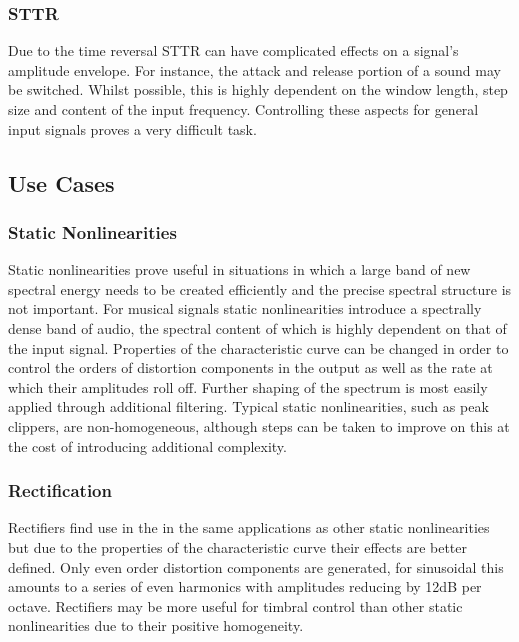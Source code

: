 		\subsubsection*{STTR}
			Due to the time reversal STTR can have complicated effects on a signal's amplitude envelope.  For
			instance, the attack and release portion of a sound may be switched. Whilst possible, this is
			highly dependent on the window length, step size and content of the input frequency. Controlling
			these aspects for general input signals proves a very difficult task.

	\subsection{Use Cases}
	\label{sec:ExcitationEvaluation-Comparison-UseCases}


		\subsubsection*{Static Nonlinearities}
			Static nonlinearities prove useful in situations in which a large band of new spectral energy needs
			to be created efficiently and the precise spectral structure is not important. For musical signals
			static nonlinearities introduce a spectrally dense band of audio, the spectral content of which is
			highly dependent on that of the input signal. Properties of the characteristic curve can be changed
			in order to control the orders of distortion components in the output as well as the rate at which
			their amplitudes roll off. Further shaping of the spectrum is most easily applied through
			additional filtering. Typical static nonlinearities, such as peak clippers, are non-homogeneous,
			although steps can be taken to improve on this at the cost of introducing additional complexity.
			
		\subsubsection*{Rectification}
			Rectifiers find use in the in the same applications as other static nonlinearities but due to the
			properties of the characteristic curve their effects are better defined. Only even order distortion
			components are generated, for sinusoidal this amounts to a series of even harmonics with amplitudes
			reducing by 12dB per octave. Rectifiers may be more useful for timbral control than other static
			nonlinearities due to their positive homogeneity.

